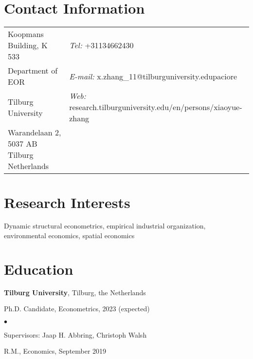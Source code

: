 \documentclass[margin,line]{res}
\newenvironment{list1}{
  \begin{list}{\ding{113}}{%
      \setlength{\itemsep}{0in}
      \setlength{\parsep}{0in} \setlength{\parskip}{0in}
      \setlength{\topsep}{0in} \setlength{\partopsep}{0in} 
      \setlength{\leftmargin}{0.17in}}}{\end{list}}
\newenvironment{list2}{
  \begin{list}{$\bullet$}{%
      \setlength{\itemsep}{0in}
      \setlength{\parsep}{0in} \setlength{\parskip}{0in}
      \setlength{\topsep}{0in} \setlength{\partopsep}{0in} 
      \setlength{\leftmargin}{0.2in}}}{\end{list}}
\begin{document}

\begin{resume}
\section{\sc Contact Information}
\vspace{.05in}
\begin{tabular}{@{}p{2in}p{4in}}
Koopmans Building, K 533     & {\it Tel:}  +31134662430 \\            
Department of EOR   &  {\it E-mail:}  x.zhang\_11@tilburguniversity.edupaciore\\         
Tilburg University &{\it Web:} research.tilburguniversity.edu/en/persons/xiaoyue-zhang \\       
Warandelaan 2, 5037 AB Tilburg Netherlands  & \\     
\end{tabular}


\section{\sc Research Interests}
Dynamic structural econometrics, empirical industrial organization, environmental economics, spatial economics

\section{\sc Education}
{\bf Tilburg University}, Tilburg, the Netherlands\\
\vspace*{-.1in}
\begin{list1}
\item[] Ph.D. Candidate, Econometrics, 2023 (expected) 
\begin{list2}
\vspace*{.05in}
\item Supervisors:  Jaap H. Abbring, Christoph Walsh
\end{list2}
\vspace*{.05in}
\item[] R.M., Economics,  September 2019
\end{list1}


\end{resume}
\end{document}
